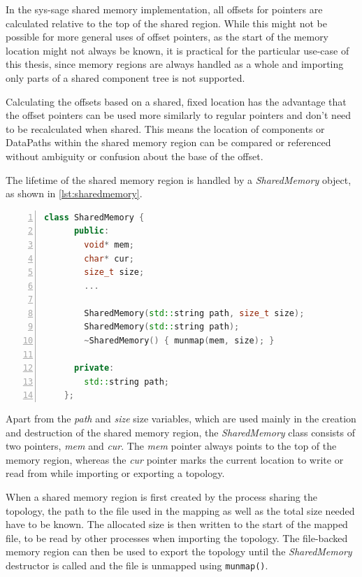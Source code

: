 In the sys-sage shared memory implementation, all offsets for pointers are calculated relative to the top of the shared region.
While this might not be possible for more general uses of offset pointers, as the start of the memory location might not always be known,
it is practical for the particular use-case of this thesis, since  memory regions are always handled as a whole and importing only parts of a shared component tree is not supported.

Calculating the offsets based on a shared, fixed location has the advantage that the offset pointers can be used more similarly to regular pointers and don't need to be recalculated when shared.
This means the location of components or DataPaths within the shared memory region can be compared or referenced without ambiguity or confusion about the base of the offset.

The lifetime of the shared memory region is handled by a \emph{SharedMemory} object, as shown in \autoref{lst:sharedmemory}.

\begin{lstlisting}[language=c++, numbers=left, caption=SharedMemory Class, captionpos=b, label={lst:sharedmemory}]
    class SharedMemory {
      public:
        void* mem;
        char* cur;
        size_t size;
        ...

        SharedMemory(std::string path, size_t size);
        SharedMemory(std::string path);
        ~SharedMemory() { munmap(mem, size); }

      private:
        std::string path;
    };
\end{lstlisting}

Apart from the \emph{path} and \emph{size} size variables, which are used mainly in the creation and destruction of the shared memory region,
the \emph{SharedMemory} class consists of two pointers, \emph{mem} and \emph{cur}.
The \emph{mem} pointer always points to the top of the memory region, whereas the \emph{cur} pointer marks the current location to write or read from while importing or exporting a topology.

When a shared memory region is first created by the process sharing the topology, the path to the file used in the mapping as well as the total size needed have to be known.
The allocated size is then written to the start of the mapped file, to be read by other processes when importing the topology.
The file-backed memory region can then be used to export the topology until the \emph{SharedMemory} destructor is called and the file is unmapped using \lstinline{munmap()}.


